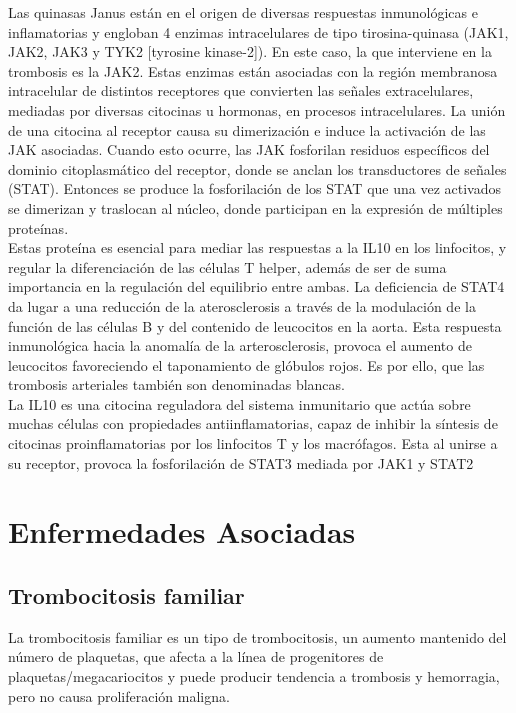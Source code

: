 		Las quinasas Janus están en el origen de diversas respuestas inmunológicas e inflamatorias y engloban 4 enzimas intracelulares de tipo tirosina-quinasa (JAK1, JAK2, JAK3 y TYK2 [tyrosine kinase-2]). En este caso, la que interviene en la trombosis es la JAK2. Estas enzimas están asociadas con la región membranosa intracelular de distintos receptores que convierten las señales extracelulares, mediadas por diversas citocinas u hormonas, en procesos intracelulares. La unión de una citocina al receptor causa su dimerización e induce la activación de las JAK asociadas. Cuando esto ocurre, las JAK fosforilan residuos específicos del dominio citoplasmático del receptor, donde se anclan los transductores de señales (STAT). Entonces se produce la fosforilación de los STAT que una vez activados se dimerizan y traslocan al núcleo, donde participan en la expresión de múltiples proteínas.\\
		
		Estas proteína es esencial para mediar las respuestas a la IL10 en los linfocitos, y regular la diferenciación de las células T helper, además de ser de suma importancia en la regulación del equilibrio entre ambas.  La deficiencia de STAT4 da lugar a una reducción de la aterosclerosis a través de la modulación de la función de las células B y del contenido de leucocitos en la aorta. Esta respuesta inmunológica hacia la anomalía de la arterosclerosis, provoca el aumento de leucocitos favoreciendo el taponamiento de glóbulos rojos. Es por ello, que las trombosis arteriales también son denominadas blancas.\\
		
	    La IL10 es una citocina reguladora del sistema inmunitario que actúa sobre muchas células con propiedades antiinflamatorias, capaz de inhibir la síntesis de citocinas proinflamatorias por los linfocitos T y los macrófagos. 
	    Esta al unirse a su receptor, provoca la fosforilación de STAT3 mediada por JAK1 y STAT2
	
	

\section{\textbf {Enfermedades Asociadas}}

\subsection { \textbf{Trombocitosis familiar}}

La trombocitosis familiar es un tipo de trombocitosis, un aumento mantenido del número de plaquetas, que afecta a la línea de progenitores de plaquetas/megacariocitos y puede producir tendencia a trombosis y hemorragia, pero no causa proliferación maligna.

